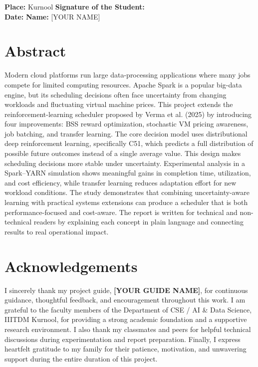 \documentclass[12pt]{Thesis}
\begin{document}
\vspace{2em}
\noindent\textbf{Place:} Kurnool \hfill \textbf{Signature of the Student:} \hrulefill\\[1em]
\textbf{Date:} \hrulefill \hfill \textbf{Name:} [YOUR NAME]

\chapter*{Abstract}
Modern cloud platforms run large data-processing applications where many jobs compete for limited computing resources. Apache Spark is a popular big-data engine, but its scheduling decisions often face uncertainty from changing workloads and fluctuating virtual machine prices. This project extends the reinforcement-learning scheduler proposed by Verma et al. (2025) by introducing four improvements: BSS reward optimization, stochastic VM pricing awareness, job batching, and transfer learning. The core decision model uses distributional deep reinforcement learning, specifically C51, which predicts a full distribution of possible future outcomes instead of a single average value. This design makes scheduling decisions more stable under uncertainty. Experimental analysis in a Spark--YARN simulation shows meaningful gains in completion time, utilization, and cost efficiency, while transfer learning reduces adaptation effort for new workload conditions. The study demonstrates that combining uncertainty-aware learning with practical systems extensions can produce a scheduler that is both performance-focused and cost-aware. The report is written for technical and non-technical readers by explaining each concept in plain language and connecting results to real operational impact.

\chapter*{Acknowledgements}
I sincerely thank my project guide, \textbf{[YOUR GUIDE NAME]}, for continuous guidance, thoughtful feedback, and encouragement throughout this work. I am grateful to the faculty members of the Department of CSE / AI \& Data Science, IIITDM Kurnool, for providing a strong academic foundation and a supportive research environment. I also thank my classmates and peers for helpful technical discussions during experimentation and report preparation. Finally, I express heartfelt gratitude to my family for their patience, motivation, and unwavering support during the entire duration of this project.

\tableofcontents
\listoffigures
\listoftables

\mainmatter









\end{document}
